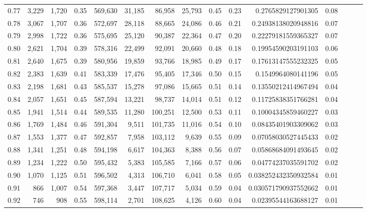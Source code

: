 \begin{tabular}{rrrrrrrrrrrrrrr}
0.77 &   3,229 &  1,720 &  0.35 &  569,630 &   31,185 &   86,958 &   25,793 &  0.45 &  0.23 &     0.2765829127901305 &      0.08 \\
0.78 &   3,067 &  1,707 &  0.36 &  572,697 &   28,118 &   88,665 &   24,086 &  0.46 &  0.21 &    0.24938138020948816 &      0.07 \\
0.79 &   2,998 &  1,722 &  0.36 &  575,695 &   25,120 &   90,387 &   22,364 &  0.47 &  0.20 &    0.22279181559365327 &      0.07 \\
0.80 &   2,621 &  1,704 &  0.39 &  578,316 &   22,499 &   92,091 &   20,660 &  0.48 &  0.18 &    0.19954590203191103 &      0.06 \\
0.81 &   2,640 &  1,675 &  0.39 &  580,956 &   19,859 &   93,766 &   18,985 &  0.49 &  0.17 &    0.17613147555232325 &      0.05 \\
0.82 &   2,383 &  1,639 &  0.41 &  583,339 &   17,476 &   95,405 &   17,346 &  0.50 &  0.15 &     0.1549964080141196 &      0.05 \\
0.83 &   2,198 &  1,681 &  0.43 &  585,537 &   15,278 &   97,086 &   15,665 &  0.51 &  0.14 &    0.13550212414967494 &      0.04 \\
0.84 &   2,057 &  1,651 &  0.45 &  587,594 &   13,221 &   98,737 &   14,014 &  0.51 &  0.12 &    0.11725838351766281 &      0.04 \\
0.85 &   1,941 &  1,514 &  0.44 &  589,535 &   11,280 &  100,251 &   12,500 &  0.53 &  0.11 &    0.10004345859460227 &      0.03 \\
0.86 &   1,769 &  1,484 &  0.46 &  591,304 &    9,511 &  101,735 &   11,016 &  0.54 &  0.10 &    0.08435401903309062 &      0.03 \\
0.87 &   1,553 &  1,377 &  0.47 &  592,857 &    7,958 &  103,112 &    9,639 &  0.55 &  0.09 &    0.07058030527445433 &      0.02 \\
0.88 &   1,341 &  1,251 &  0.48 &  594,198 &    6,617 &  104,363 &    8,388 &  0.56 &  0.07 &    0.05868684091493645 &      0.02 \\
0.89 &   1,234 &  1,222 &  0.50 &  595,432 &    5,383 &  105,585 &    7,166 &  0.57 &  0.06 &    0.04774237035591702 &      0.02 \\
0.90 &   1,070 &  1,125 &  0.51 &  596,502 &    4,313 &  106,710 &    6,041 &  0.58 &  0.05 &   0.038252432350932584 &      0.01 \\
0.91 &     866 &  1,007 &  0.54 &  597,368 &    3,447 &  107,717 &    5,034 &  0.59 &  0.04 &   0.030571790937552662 &      0.01 \\
0.92 &     746 &    908 &  0.55 &  598,114 &    2,701 &  108,625 &    4,126 &  0.60 &  0.04 &    0.02395544163688127 &      0.01 \\

\end{tabular}
